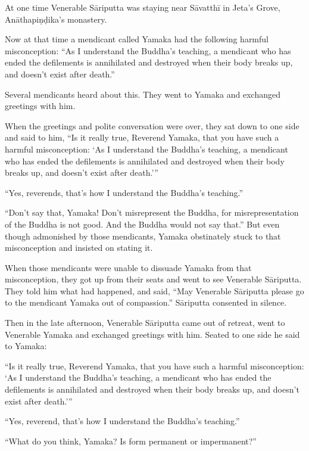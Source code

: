 \documentclass[12pt,openany]{book}%
\begin{document}
At one time Venerable \textsanskrit{Sāriputta} was staying near \textsanskrit{Sāvatthī} in Jeta’s Grove, \textsanskrit{Anāthapiṇḍika}’s monastery. 

Now at that time a mendicant called Yamaka had the following harmful misconception: “As I understand the Buddha’s teaching, a mendicant who has ended the defilements is annihilated and destroyed when their body breaks up, and doesn’t exist after death.” 

Several mendicants heard about this. They went to Yamaka and exchanged greetings with him. 

When the greetings and polite conversation were over, they sat down to one side and said to him, “Is it really true, Reverend Yamaka, that you have such a harmful misconception: ‘As I understand the Buddha’s teaching, a mendicant who has ended the defilements is annihilated and destroyed when their body breaks up, and doesn’t exist after death.’” 

“Yes, reverends, that’s how I understand the Buddha’s teaching.” 

“Don’t say that, Yamaka! Don’t misrepresent the Buddha, for misrepresentation of the Buddha is not good. And the Buddha would not say that.” But even though admonished by those mendicants, Yamaka obstinately stuck to that misconception and insisted on stating it. 

When those mendicants were unable to dissuade Yamaka from that misconception, they got up from their seats and went to see Venerable \textsanskrit{Sāriputta}. They told him what had happened, and said, “May Venerable \textsanskrit{Sāriputta} please go to the mendicant Yamaka out of compassion.” \textsanskrit{Sāriputta} consented in silence. 

Then in the late afternoon, Venerable \textsanskrit{Sāriputta} came out of retreat, went to Venerable Yamaka and exchanged greetings with him. Seated to one side he said to Yamaka: 

“Is it really true, Reverend Yamaka, that you have such a harmful misconception: ‘As I understand the Buddha’s teaching, a mendicant who has ended the defilements is annihilated and destroyed when their body breaks up, and doesn’t exist after death.’” 

“Yes, reverend, that’s how I understand the Buddha’s teaching.” 

“What do you think, Yamaka? Is form permanent or impermanent?” 
\end{document}
